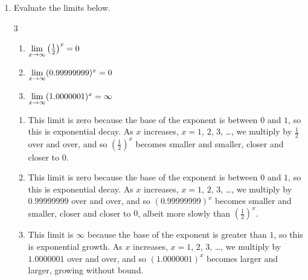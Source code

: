 \documentclass[main]{subfiles}
\begin{document}
\begin{enumerate}[resume]
\begin{enumerate}
    \begin{solution}
      This is ; such a limit is always $\infty$.  That
      is, if $\displaystyle \lim_{x \to a} f(x) = \infty$ and
      $\displaystyle \lim_{x \to a} g(x) = \infty$, then $\displaystyle
      \lim_{x \to a} f(x) g(x) = \infty$. 
    \end{solution}

  \end{enumerate}



  \item Evaluate the limits below.
\begin{multicols}{3}
\begin{enumerate}



  \item $\lim\limits_{x\to\infty} \left(\frac{1}{2}\right)^x=0$

  \item $\lim\limits_{x\to\infty} (0.99999999)^x=0$

  \item $\lim\limits_{x\to\infty} (1.0000001)^x=\infty$

\end{enumerate}
\end{multicols}

\begin{solution}
\begin{enumerate}

  \item This limit is zero because the base of the exponent is between $0$ and $1$,
    so this is exponential decay. As $x$ increases, $x=1$, $2$, $3$, \dots , we
    multiply by $\frac{1}{2}$ over and over, and so $\left(\frac{1}{2}\right)^x$
    becomes smaller and smaller, closer and closer to $0$.

  \item This limit is zero because the base of the exponent is between $0$ and $1$,
    so this is exponential decay. As $x$ increases, $x=1$, $2$, $3$, \dots , we
    multiply by $0.99999999$ over and over, and so $(0.99999999)^x$
    becomes smaller and smaller, closer and closer to $0$, albeit more slowly than
    $\left(\frac{1}{2}\right)^x$.

  \item This limit is $\infty$ because the base of the exponent is greater than
    $1$, so this is exponential growth. As $x$ increases, $x=1$, $2$, $3$, \dots ,
    we multiply by $1.0000001$ over and over, and so $(1.0000001)^x$
    becomes larger and larger, growing without bound.


\end{enumerate}
\end{solution}
\end{enumerate}
\end{document}
